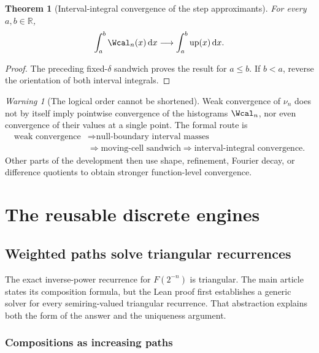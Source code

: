 \documentclass[11pt,oneside]{article}
\newtheorem{theorem}{Theorem}[section]
\theoremstyle{definition}
\theoremstyle{remark}
\newtheorem{warning}[warning]{Warning}
\newcommand{\R}{\mathbb R}
\newcommand{\Up}{\operatorname{up}}
\newcommand{\dd}{\,\mathrm d}
\begin{document}
\begin{theorem}[Interval-integral convergence of the step approximants]
\label{integration:thm:step-integral-convergence}
For every $a,b\in\R$,
\begin{equation}
 \int_a^b\Wcal_n(x)\dd x
 \longrightarrow
 \int_a^b\Up(x)\dd x.
 \label{integration:eq:step-integral-convergence}
\end{equation}
\end{theorem}

\begin{proof}
The preceding fixed-$\delta$ sandwich proves the result for $a\le b$.  If $b<a$, reverse the
orientation of both interval integrals.
\end{proof}

\begin{warning}[The logical order cannot be shortened]
Weak convergence of $\nu_n$ does not by itself imply pointwise convergence of the
histograms $\Wcal_n$, nor even convergence of their values at a single point.  The formal
route is
\[
\begin{aligned}
 \text{weak convergence}
 &\Longrightarrow \text{null-boundary interval masses}\\
 &\Longrightarrow \text{moving-cell sandwich}
 \Longrightarrow \text{interval-integral convergence}.
\end{aligned}
\]
Other parts of the development then use shape, refinement, Fourier decay, or difference
quotients to obtain stronger function-level convergence.
\end{warning}

\section{The reusable discrete engines}

\subsection{Weighted paths solve triangular recurrences}
\label{integration:sec:path-sums}

The exact inverse-power recurrence for $F(2^{-n})$ is triangular.  The main article states its
composition formula, but the Lean proof first establishes a generic solver for every
semiring-valued triangular recurrence.  That abstraction explains both the form of the
answer and the uniqueness argument.

\subsubsection{Compositions as increasing paths}
\end{document}

